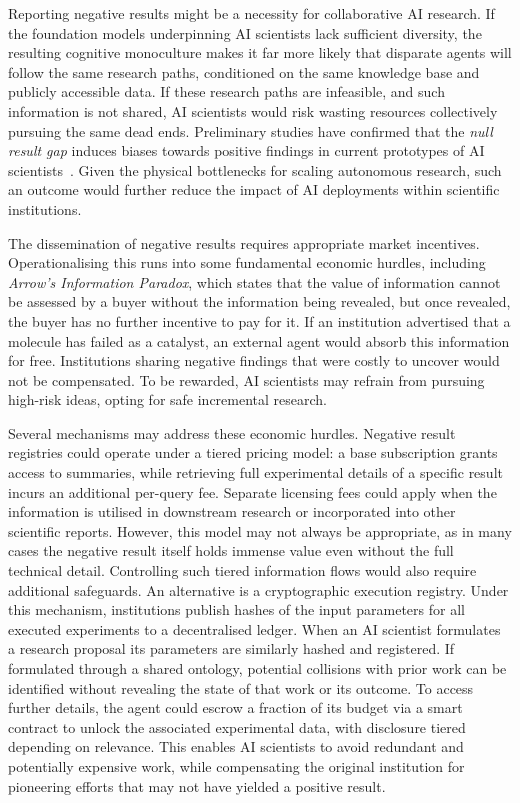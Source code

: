 \documentclass[11pt, a4paper, twocolumn, goog]{google}
\begin{document}
Reporting negative results might be a necessity for collaborative AI research. If the foundation models underpinning AI scientists lack sufficient diversity, the resulting cognitive monoculture makes it far more likely that disparate agents will follow the same research paths, conditioned on the same knowledge base and publicly accessible data. If these research paths are infeasible, and such information is not shared, AI scientists would risk wasting resources collectively pursuing the same dead ends. Preliminary studies have confirmed that the \emph{null result gap} induces biases towards positive findings in current prototypes of AI scientists~\citep{chauhan2026deadsciencewalkingpublication}. Given the physical bottlenecks for scaling autonomous research, such an outcome would further reduce the impact of AI deployments within scientific institutions.

The dissemination of negative results requires appropriate market incentives. Operationalising this runs into some fundamental economic hurdles, including \emph{Arrow’s Information Paradox}, which states that the value of information cannot be assessed by a buyer without the information being revealed, but once revealed, the buyer has no further incentive to pay for it. If an institution advertised that a molecule has failed as a catalyst, an external agent would absorb this information for free. Institutions sharing negative findings that were costly to uncover would not be compensated. To be rewarded, AI scientists may refrain from pursuing high-risk ideas, opting for safe incremental research.

Several mechanisms may address these economic hurdles. Negative result registries could operate under a tiered pricing model: a base subscription grants access to summaries, while retrieving full experimental details of a specific result incurs an additional per-query fee. Separate licensing fees could apply when the information is utilised in downstream research or incorporated into other scientific reports. However, this model may not always be appropriate, as in many cases the negative result itself holds immense value even without the full technical detail. Controlling such tiered information flows would also require additional safeguards. An alternative is a cryptographic execution registry. Under this mechanism, institutions publish hashes of the input parameters for all executed experiments to a decentralised ledger. When an AI scientist formulates a research proposal its parameters are similarly hashed and registered. If formulated through a shared ontology, potential collisions with prior work can be identified without revealing the state of that work or its outcome. To access further details, the agent could escrow a fraction of its budget via a smart contract to unlock the associated experimental data, with disclosure tiered depending on relevance. This enables AI scientists to avoid redundant and potentially expensive work, while compensating the original institution for pioneering efforts that may not have yielded a positive result.
\end{document}
